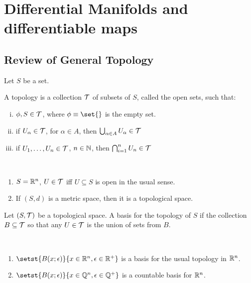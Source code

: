 
\section{Differential Manifolds and differentiable maps}
\label{Section1}

\subsection{Review of General Topology}

Let $S$ be a set.

\begin{definition}
	A topology is a collection $\mathcal{T}$ of subsets of $S$, called the open sets, such that:
	\begin{enumerate}[(i)]
		\item $\phi, S \in \mathcal{T}$, where $\phi\equiv\set{}$ is the empty set.
		\item if $U_\alpha \in \mathcal{T}$, for $\alpha\in A$, then $\bigcup_{\alpha\in A} U_\alpha \in \mathcal{T}$
		\item if $U_1, \dots, U_n \in \mathcal{T}$, $n \in \mathbb N$, then $\bigcap_{i=1}^n U_n \in \mathcal{T}$  
	\end{enumerate}
\end{definition}

\begin{example}
	~
	\begin{enumerate}[1)]
		\item $ S=\mathbb R^n$, $U \in \mathcal{T}$ iff $U \subseteq S$ is open in the usual sense.
		\item If $(S, d)$ is a metric space, then it is a topological space.
	\end{enumerate}
\end{example}

\begin{definition}
	Let $(S,\mathcal{T})$ be a topological space. A basis for the topology of $S$ if the collection $B \subseteq \mathcal{T}$ so that any $U\in\mathcal{T}$ is the union of sets from $B$.
\end{definition}

\begin{example}
	~
	\begin{enumerate}[1)]
		\item $\setst{B(x;\epsilon)}{ x \in \bbR^n, \epsilon\in\bbR^+}$ is a basis for the usual topology in $\mathbb R^n$.
		\item $\setst{B(x;\epsilon)}{ x \in \bbQ^n, \epsilon\in\bbQ^+}$ is a countable basis for $\mathbb R^n$.
	\end{enumerate}
\end{example}

